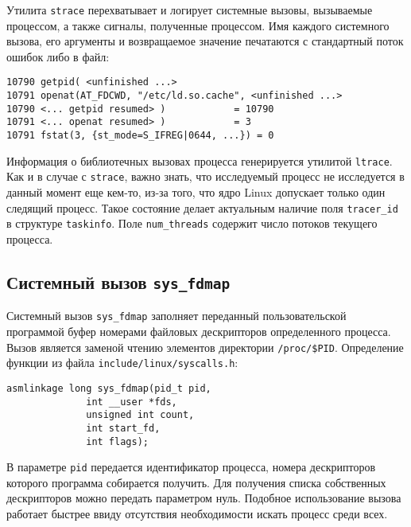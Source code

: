 Утилита \texttt{strace} перехватывает и логирует системные вызовы, вызываемые
процессом, а также сигналы, полученные процессом. Имя каждого системного вызова,
его аргументы и возвращаемое значение печатаются с стандартный поток ошибок либо
в файл:

\medskip
\begin{lstlisting}[style=cstyle]
10790 getpid( <unfinished ...>
10791 openat(AT_FDCWD, "/etc/ld.so.cache", <unfinished ...>
10790 <... getpid resumed> )            = 10790
10791 <... openat resumed> )            = 3
10791 fstat(3, {st_mode=S_IFREG|0644, ...}) = 0
\end{lstlisting}
\medskip

Информация о библиотечных вызовах процесса генерируется утилитой
\texttt{ltrace}. Как и в случае с \texttt{strace}, важно знать, что исследуемый
процесс не исследуется в данный момент еще кем-то, из-за того, что ядро Linux
допускает только один следящий процесс. Такое состояние делает актуальным
наличие поля \texttt{tracer\_id} в структуре \texttt{taskinfo}.
Поле \texttt{num\_threads} содержит число потоков текущего процесса.

\subsection{Системный вызов \texttt{sys\_fdmap}}

Системный вызов \texttt{sys\_fdmap} заполняет переданный пользовательской
программой буфер номерами файловых дескрипторов определенного процесса. Вызов
является заменой чтению элементов директории \texttt{/proc/\$PID}. Определение
функции из файла \texttt{include/linux/syscalls.h}:

\medskip
\begin{lstlisting}[style=cstyle]
asmlinkage long sys_fdmap(pid_t pid,
			  int __user *fds,
			  unsigned int count,
			  int start_fd,
			  int flags);
\end{lstlisting}
\medskip

В параметре \texttt{pid} передается идентификатор процесса, номера дескрипторов
которого программа собирается получить. Для получения списка собственных
дескрипторов можно передать параметром нуль. Подобное использование вызова
работает быстрее ввиду отсутствия необходимости искать процесс среди всех.

